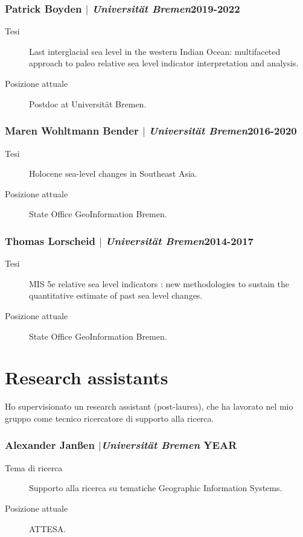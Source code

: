 \documentclass[11pt]{article}
\begin{document}
\subsubsection{Patrick Boyden $|$ {\normalfont\textit{Universität Bremen}}\hfill 2019-2022}
{\footnotesize 
\begin{description}
  \item [Tesi] Last interglacial sea level in the western Indian Ocean: multifaceted approach to paleo relative sea level indicator interpretation and analysis.
  \item [Posizione attuale] Postdoc at Universität Bremen. 
\end{description}
}
\smallskip

\subsubsection{Maren Wohltmann Bender $|$ {\normalfont\textit{Universität Bremen}}\hfill 2016-2020}
{\footnotesize 
\begin{description}
  \item [Tesi] Holocene sea-level changes in Southeast Asia.
  \item [Posizione attuale] State Office GeoInformation Bremen. 
\end{description}
}
\smallskip

\subsubsection{Thomas Lorscheid $|$ {\normalfont\textit{Universität Bremen}}\hfill 2014-2017}
{\footnotesize 
\begin{description}
  \item [Tesi] MIS 5e relative sea level indicators : new methodologies to sustain the quantitative estimate of past sea level changes.
  \item [Posizione attuale] State Office GeoInformation Bremen. 
\end{description}
}

\smallskip
\section{Research assistants}
{\normalfont Ho supervisionato un research assistant (post-laurea), che ha lavorato nel mio gruppo come tecnico ricercatore di supporto alla ricerca.}\\

\subsubsection{Alexander Janßen $|${\normalfont\textit{Universität Bremen}} \hfill YEAR}
{\footnotesize 
\begin{description}
  \item [Tema di ricerca] Supporto alla ricerca su tematiche Geographic Information Systems. 
  \item [Posizione attuale] ATTESA.

\end{description}
}
\end{document}
